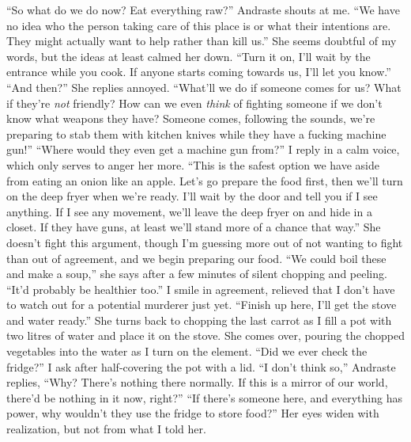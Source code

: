 \documentclass[a4paper, 12pt]{book}
\newcommand\tab[1][1cm]{\hspace*{#1}}
\begin{document}
\newline
\tab
``So what do we do now? Eat everything raw?'' Andraste shouts at me.
\newline
\tab
``We have no idea who the person taking care of this place is or what their intentions are. They might actually want to help rather than kill us.'' She seems doubtful of my words, but the ideas at least calmed her down. ``Turn it on, I’ll wait by the entrance while you cook. If anyone starts coming towards us, I’ll let you know.''
\newline
\tab
``And then?'' She replies annoyed. ``What’ll we do if someone comes for us? What if they’re \textit{not} friendly? How can we even \textit{think} of fighting someone if we don’t know what weapons they have? Someone comes, following the sounds, we’re preparing to stab them with kitchen knives while they have a fucking machine gun!''
\newline
\tab
``Where would they even get a machine gun from?'' I reply in a calm voice, which only serves to anger her more. ``This is the safest option we have aside from eating an onion like an apple. Let’s go prepare the food first, then we’ll turn on the deep fryer when we’re ready. I’ll wait by the door and tell you if I see anything. If I see any movement, we’ll leave the deep fryer on and hide in a closet. If they have guns, at least we’ll stand more of a chance that way.'' She doesn’t fight this argument, though I’m guessing more out of not wanting to fight than out of agreement, and we begin preparing our food.
\newline
\tab
``We could boil these and make a soup,'' she says after a few minutes of silent chopping and peeling. ``It’d probably be healthier too.''
\newline
\tab
I smile in agreement, relieved that I don’t have to watch out for a potential murderer just yet. ``Finish up here, I’ll get the stove and water ready.'' She turns back to chopping the last carrot as I fill a pot with two litres of water and place it on the stove. She comes over, pouring the chopped vegetables into the water as I turn on the element. ``Did we ever check the fridge?'' I ask after half-covering the pot with a lid.
\newline
\tab
``I don’t think so,'' Andraste replies, ``Why? There’s nothing there normally. If this is a mirror of our world, there’d be nothing in it now, right?''
\newline
\tab
``If there’s someone here, and everything has power, why wouldn’t they use the fridge to store food?'' Her eyes widen with realization, but not from what I told her.
\end{document}
